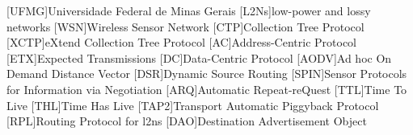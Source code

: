
[UFMG]{Universidade Federal de Minas Gerais}
[L2Ns]{low-power and lossy networks}
[WSN]{Wireless Sensor Network}
[CTP]{Collection Tree Protocol}
[XCTP]{eXtend Collection Tree Protocol}
[AC]{Address-Centric Protocol}
[ETX]{Expected Transmissions}
[DC]{Data-Centric Protocol}
[AODV]{Ad hoc On Demand Distance Vector} 
[DSR]{Dynamic Source Routing} [SPIN]{Sensor Protocols for Information via
Negotiation} 
[ARQ]{Automatic Repeat-reQuest}
[TTL]{Time To Live}
[THL]{Time Has Live}
[TAP2]{Transport Automatic Piggyback Protocol}
[RPL]{Routing Protocol for \acl{l2ns}}
[DAO]{Destination Advertisement Object}

